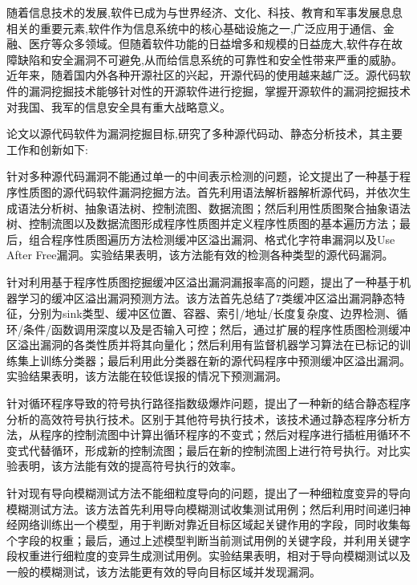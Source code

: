 \begin{cabstract}
随着信息技术的发展,软件已成为与世界经济、文化、科技、教育和军事发展息息相关的重要元素,软件作为信息系统中的核心基础设施之一,广泛应用于通信、金融、医疗等众多领域。但随着软件功能的日益增多和规模的日益庞大,软件存在故障缺陷和安全漏洞不可避免,从而给信息系统的可靠性和安全性带来严重的威胁。近年来，随着国内外各种开源社区的兴起，开源代码的使用越来越广泛。源代码软件的漏洞挖掘技术能够针对性的开源软件进行挖掘，掌握开源软件的漏洞挖掘技术对我国、我军的信息安全具有重大战略意义。

论文以源代码软件为漏洞挖掘目标,研究了多种源代码动、静态分析技术，其主要工作和创新如下:

针对多种源代码漏洞不能通过单一的中间表示检测的问题，论文提出了一种基于程序性质图的源代码软件漏洞挖掘方法。首先利用语法解析器解析源代码，并依次生成语法分析树、抽象语法树、控制流图、数据流图；然后利用性质图聚合抽象语法树、控制流图以及数据流图形成程序性质图并定义程序性质图的基本遍历方法；最后，组合程序性质图遍历方法检测缓冲区溢出漏洞、格式化字符串漏洞以及Use After Free漏洞。实验结果表明，该方法能有效的检测各种类型的源代码漏洞。

针对利用基于程序性质图挖掘缓冲区溢出漏洞漏报率高的问题，提出了一种基于机器学习的缓冲区溢出漏洞预测方法。该方法首先总结了7类缓冲区溢出漏洞静态特征，分别为sink类型、缓冲区位置、容器、索引/地址/长度复杂度、边界检测、循环/条件/函数调用深度以及是否输入可控；然后，通过扩展的程序性质图检测缓冲区溢出漏洞的各类性质并将其向量化；然后利用有监督机器学习算法在已标记的训练集上训练分类器；最后利用此分类器在新的源代码程序中预测缓冲区溢出漏洞。实验结果表明，该方法能在较低误报的情况下预测漏洞。

针对循环程序导致的符号执行路径指数级爆炸问题，提出了一种新的结合静态程序分析的高效符号执行技术。区别于其他符号执行技术，该技术通过静态程序分析方法，从程序的控制流图中计算出循环程序的不变式；然后对程序进行插桩用循环不变式代替循环，形成新的控制流图；最后在新的控制流图上进行符号执行。对比实验表明，该方法能有效的提高符号执行的效率。

针对现有导向模糊测试方法不能细粒度导向的问题，提出了一种细粒度变异的导向模糊测试方法。该方法首先利用导向模糊测试收集测试用例；然后利用时间递归神经网络训练出一个模型，用于判断对靠近目标区域起关键作用的字段，同时收集每个字段的权重；最后，通过上述模型判断当前测试用例的关键字段，并利用关键字段权重进行细粒度的变异生成测试用例。实验结果表明，相对于导向模糊测试以及一般的模糊测试，该方法能更有效的导向目标区域并发现漏洞。


\end{cabstract}

